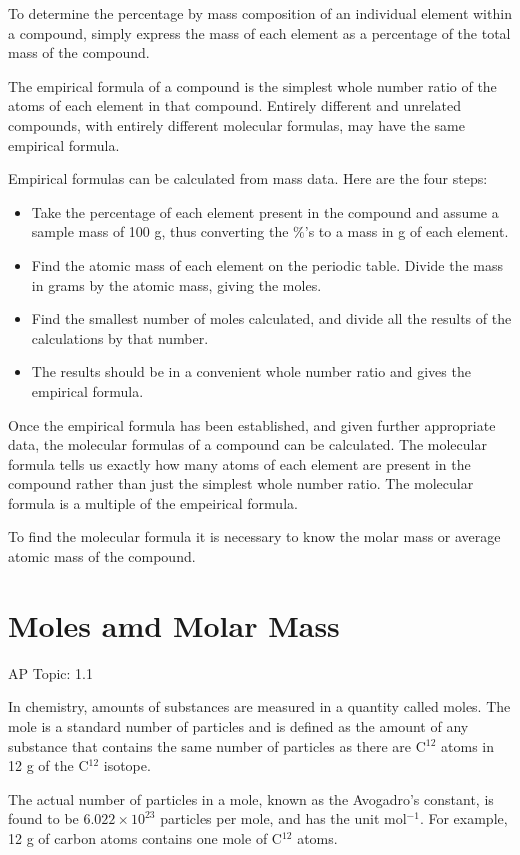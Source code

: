 \documentclass[../chem.tex]{subfiles}
\begin{document}
To determine the percentage by mass composition of an individual element within a compound, simply express the mass of each element as a percentage of the total mass of the compound.

The empirical formula of a compound is the simplest whole number ratio of the atoms of each element in that compound. 
Entirely different and unrelated compounds, with entirely different molecular formulas, may have the same empirical formula.

Empirical formulas can be calculated from mass data. Here are the four steps:
\begin{itemize}
    \item Take the percentage of each element present in the compound and assume a sample mass of 100 g, thus converting the $\%$'s to a mass in g of each element.
    \item Find the atomic mass of each element on the periodic table. Divide the mass in grams by the atomic mass, giving the moles.
    \item Find the smallest number of moles calculated, and divide all the results of the calculations by that number.
    \item The results should be in a convenient whole number ratio and gives the empirical formula.
\end{itemize}

Once the empirical formula has been established, and given further appropriate data, the molecular formulas of a compound can be calculated.
The molecular formula tells us exactly how many atoms of each element are present in the compound rather than just the simplest whole number ratio.
The molecular formula is a multiple of the empeirical formula.

To find the molecular formula it is necessary to know the molar mass or average atomic mass of the compound. 
\section{Moles amd Molar Mass}
AP Topic: 1.1

In chemistry, amounts of substances are measured in a quantity called moles. The mole is a standard number of particles and is defined as the 
amount of any substance that contains the same number of particles as there are C$^{12}$ atoms in 12 g of the C$^{12}$ isotope.

The actual number of particles in a mole, known as the Avogadro's constant, is found to be $6.022\times10^{23}$ particles per mole, and has the unit mol$^{-1}$. 
For example, 12 g of carbon atoms contains one mole of C$^{12}$ atoms.
\end{document}
